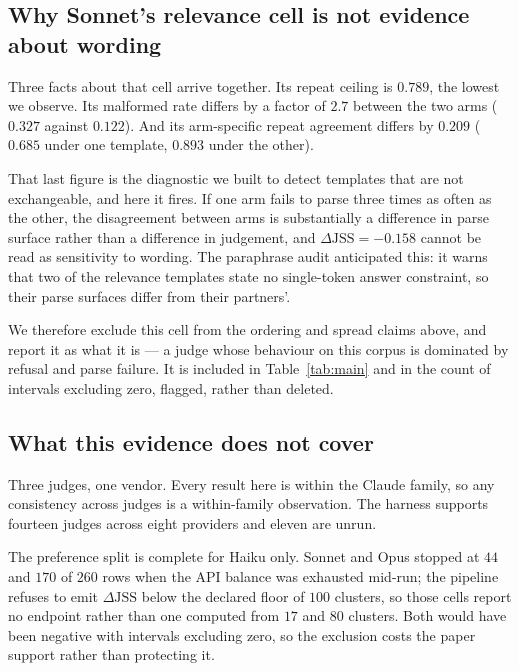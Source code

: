 \subsection{Why Sonnet's relevance cell is not evidence about wording}
\label{sec:results-sonnet-relevance}

Three facts about that cell arrive together. Its repeat ceiling is $0.789$, the
lowest we observe. Its malformed rate differs by a factor of $2.7$ between the
two arms ($0.327$ against $0.122$). And its arm-specific repeat agreement differs
by $0.209$ ($0.685$ under one template, $0.893$ under the other).

That last figure is the diagnostic we built to detect templates that are not
exchangeable, and here it fires. If one arm fails to parse three times as often
as the other, the disagreement between arms is substantially a difference in
parse surface rather than a difference in judgement, and
$\Delta\mathrm{JSS}=-0.158$ cannot be read as sensitivity to wording. The
paraphrase audit anticipated this: it warns that two of the relevance templates
state no single-token answer constraint, so their parse surfaces differ from
their partners'.

We therefore exclude this cell from the ordering and spread claims above, and
report it as what it is --- a judge whose behaviour on this corpus is dominated
by refusal and parse failure. It is included in Table~\ref{tab:main} and in the
count of intervals excluding zero, flagged, rather than deleted.

\subsection{What this evidence does not cover}
\label{sec:results-limits}

Three judges, one vendor. Every result here is within the Claude family, so any
consistency across judges is a within-family observation. The harness supports
fourteen judges across eight providers and eleven are unrun.

The preference split is complete for Haiku only. Sonnet and Opus stopped at $44$
and $170$ of $260$ rows when the API balance was exhausted mid-run; the pipeline
refuses to emit $\Delta\mathrm{JSS}$ below the declared floor of $100$ clusters,
so those cells report no endpoint rather than one computed from $17$ and $80$
clusters. Both would have been negative with intervals excluding zero, so the
exclusion costs the paper support rather than protecting it.

